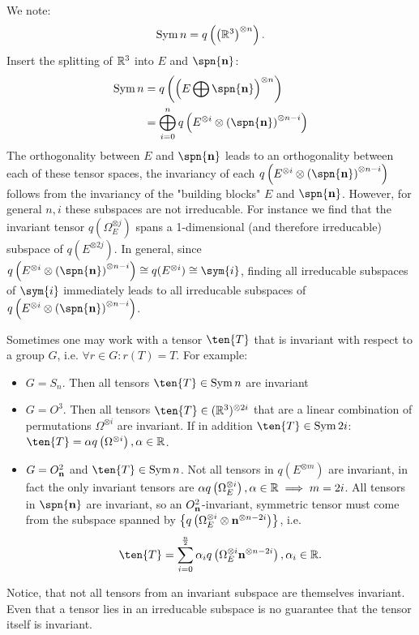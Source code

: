 \begin{example}
	We note:
	\[\operatorname{Sym}{n} = q\left(\left(\mathbb{R}^3\right)^{\otimes n}\right).\]
	Insert the splitting of $\mathbb{R}^3$ into $E$ and $\spn{\vc{n}}$:
	\begin{align*}
		\Sym{n} &= q\left(\left(E\bigoplus\spn{\vc{n}}\right)^{\otimes n}\right) \\
		&=\bigoplus_{i=0}^n q\left(E^{\otimes i}\otimes \left(\spn{\vc{n}}\right)^{\otimes n-i}\right)
	\end{align*}
	The orthogonality between $E$ and $\spn{\vc{n}}$ leads to an orthogonality between each of these tensor spaces, the invariancy of each $q\left(E^{\otimes i}\otimes \left(\spn{\vc{n}}\right)^{\otimes n-i}\right)$ follows from the invariancy of the "building blocks" $E$ and $\spn{\vc{n}}$. However, for general $n,i$ these subspaces are not irreducable. For instance we find that the invariant tensor $q(\Omega_E^{\otimes j})$ spans a 1-dimensional (and therefore irreducable) subspace  of $q(E^{\otimes 2j})$. In general, since $q\left(E^{\otimes i}\otimes \left(\spn{\vc{n}}\right)^{\otimes n-i}\right)\cong q(E^{\otimes i})\cong\sym{i}$, finding all irreducable subspaces of $\sym{i}$ immediately leads to all irreducable subspaces of $q\left(E^{\otimes i}\otimes \left(\spn{\vc{n}}\right)^{\otimes n-i}\right)$. 
\end{example}
\begin{remark}
	Sometimes one may work with a tensor $\ten{T}$ that is invariant with respect to a group $G$, i.e. $\forall r\in G: r(T) = T$. For example:
	\begin{itemize}
		\item $G=S_n$. Then all tensors $\ten{T}\in\Sym{n}$ are invariant
		\item $G=O^3$. Then all tensors $\ten{T}\in(\IR^3)^{\otimes 2i}$ that are a linear combination of permutations $\Omega^{\otimes i}$ are invariant. If in addition $\ten{T}\in\Sym{2i}$: $\ten{T}=\alpha q\left(\Omega^{\otimes i}\right), \alpha\in\IR$.
		\item $G=O^2_{\mathbf{n}}$ and $\ten{T}\in\Sym{n}$. Not all tensors in $q\left(E^{\otimes m}\right)$ are invariant, in fact the only invariant tensors are $\alpha q\left(\Omega_E^{\otimes i}\right), \alpha\in\mathbb{R}\implies m=2i$. All tensors in $\spn{\vc{n}}$ are invariant, so an $O^2_{\mathbf{n}}$-invariant, symmetric tensor must come from the subspace spanned by $\left\{q\left(\Omega_E^{\otimes i}\otimes \mathbf{n}^{\otimes n-2i}\right)\right\}$, i.e.
		\begin{equation}
			\ten{T}=\sum_{i=0}^{\frac{n}{2}} \alpha_i q\left(\Omega_E^{\otimes i}\vc{n}^{\otimes n-2i}\right), \alpha_i \in \IR.
			\label{eq:O2invariantTensors}
		\end{equation}
	\end{itemize}
	Notice, that not all tensors from an invariant subspace are themselves invariant. Even that a tensor lies in an irreducable subspace is no guarantee that the tensor itself is invariant. 
\end{remark}

